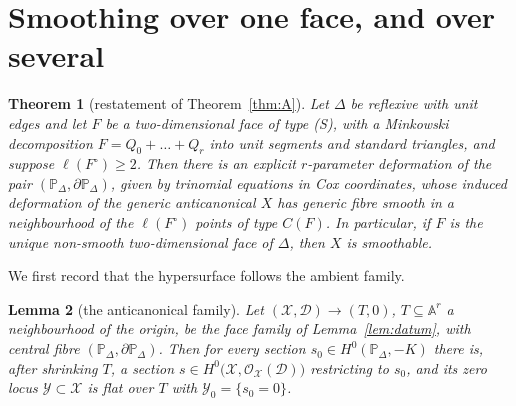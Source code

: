 \documentclass[11pt]{amsart}
\newtheorem{theorem}{Theorem}[section]
\newtheorem{lemma}[theorem]{Lemma}
\theoremstyle{definition}
\theoremstyle{remark}
\newcommand{\PP}{\mathbb{P}}
\begin{document}
\section{Smoothing over one face, and over several}\label{sec:proofA}

\begin{theorem}[restatement of Theorem~\textup{\ref{thm:A}}]\label{thm:A2}
Let $\Delta$ be reflexive with unit edges and let $F$ be a
two-dimensional face of type \textup{(S)}, with a Minkowski decomposition
$F = Q_0 + \dots + Q_r$ into unit segments and standard triangles, and
suppose $\ell(F^\circ) \ge 2$.  Then there is an explicit $r$-parameter
deformation of the pair $(\PP_\Delta, \partial\PP_\Delta)$, given by
trinomial equations in Cox coordinates, whose induced deformation of the
generic anticanonical $X$ has generic fibre smooth in a neighbourhood of
the $\ell(F^\circ)$ points of type $C(F)$.  In particular, if $F$ is the
\emph{unique} non-smooth two-dimensional face of $\Delta$, then $X$ is
smoothable.
\end{theorem}

We first record that the hypersurface follows the ambient family.

\begin{lemma}[the anticanonical family]\label{lem:sections}
Let $(\mathcal{X}, \mathcal{D}) \to (T,0)$, $T \subseteq \mathbb{A}^r$ a
neighbourhood of the origin, be the face family of
Lemma~\textup{\ref{lem:datum}}, with central fibre
$(\PP_\Delta, \partial\PP_\Delta)$.  Then for every section
$s_0 \in H^0(\PP_\Delta, -K)$ there is, after shrinking $T$, a section
$s \in H^0\bigl(\mathcal{X}, \mathcal{O}_{\mathcal{X}}(\mathcal{D})\bigr)$
restricting to $s_0$, and its zero locus $\mathcal{Y} \subset \mathcal{X}$
is flat over $T$ with $\mathcal{Y}_0 = \{s_0 = 0\}$.
\end{lemma}
\end{document}
